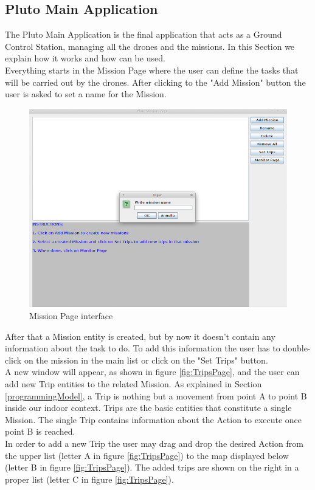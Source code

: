 \subsection{Pluto Main Application}
\label{plutoMainApp}

The Pluto Main Application is the final application that acts as a Ground Control Station, managing all the drones and the missions. In this Section we explain how it works and how can be used.
\\
Everything starts in the Mission Page where the user can define the tasks that will be carried out by the drones. After clicking to the "Add Mission" button the user is asked to set a name for the Mission.

\begin{figure}[H]
  \centering
  \includegraphics[width=\linewidth]{pictures/MissionPage.png}
  \caption{Mission Page interface}
  \label{fig:MissionPage}
\end{figure}

After that a Mission entity is created, but by now it doesn't contain any information about the task to do. To add this information the user has to double-click on the mission in the main list or click on the "Set Trips" button.
\\
A new window will appear, as shown in figure \ref{fig:TripsPage}, and the user can add new Trip entities to the related Mission. As explained in Section \ref{programmingModel}, a Trip is nothing but a movement from point A to point B inside our indoor context. Trips are the basic entities that constitute a single Mission. The single Trip contains information about the Action to execute once point B is reached.
\\
In order to add a new Trip the user may drag and drop the desired Action from the upper list (letter A in figure \ref{fig:TripsPage}) to the map displayed below (letter B in figure \ref{fig:TripsPage}). The added trips are shown on the right in a proper list (letter C in figure \ref{fig:TripsPage}).


